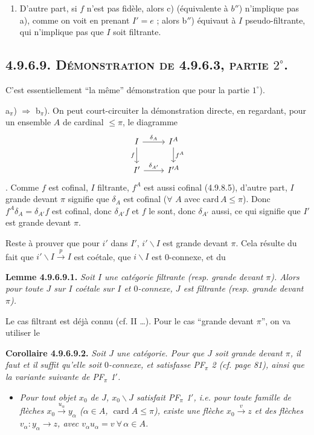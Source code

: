 \documentclass[11pt]{article}
\newcommand{\printedpage}[1]{\marginpar{\footnotesize p.~#1}}
\newcommand{\msp}[1]{\marginpar{\footnotesize [#1]}}
\newcommand{\card}{\operatorname{card}}
\newcommand{\bs}{\backslash}
\begin{document}
\begin{enumerate}[label=\arabic*$^\circ$)]
\item D'autre part, si $f$ n'est pas fidèle, alors c) (équivalente à $b''$) n'implique pas a), comme on voit en prenant $I' = e$ ; alors b$''$) équivaut à $I$ pseudo-filtrante, qui n'implique pas que $I$ soit filtrante.
\end{enumerate}

\subsection*{\msp{page 237}\textbf{4.9.6.9.} \textsc{Démonstration de 4.9.6.3, partie} $2^\circ$.}

C'est essentiellement “la même” démonstration que pour la partie $1^\circ$).

a$_\pi$) $\Longrightarrow$ b$_\pi$). On peut court-circuiter la démonstration directe, en regardant, pour un ensemble $A$ de cardinal $\leqslant \pi$, le diagramme
\[
\begin{tikzcd}
I \arrow[r, "\delta_A"] \arrow[d, "f"'] & I^A \arrow[d, "f^A"] \\
I' \arrow[r, "\delta_{A'}"] & I'^A
\end{tikzcd}
\]
. Comme $f$ est cofinal, $I$ filtrante, $f^A$ est aussi cofinal (4.9.8.5), d'autre part, $I$ grande devant $\pi$ signifie que $\delta_A$ est cofinal ($\forall$ $A$ avec $\mathrm{card}\, A \leqslant \pi$). Donc $f^A\delta_A = \delta_{A'}f$ est cofinal, donc $\delta_{A'}f$ et $f$ le sont, donc $\delta_{A'}$ aussi, ce qui signifie que $I'$ est grande devant $\pi$.

Reste à prouver que pour $i'$ dans $I'$, $i'\bs I$ est grande devant $\pi$. Cela résulte du fait que $i'\bs I \xrightarrow{p} I$ est coétale, que $i\bs I$ est 0-connexe, et du

\textbf{Lemme 4.9.6.9.1.} \textit{Soit $I$ une catégorie filtrante (resp. grande devant $\pi$). Alors pour toute $J$ sur $I$ coétale sur $I$ et $0$-connexe, $J$ est filtrante (resp. grande devant $\pi$).}

\printedpage{89}

Le cas filtrant est déjà connu (cf. II \dots). Pour le cas “grande devant $\pi$”, on va utiliser le

\textbf{Corollaire 4.9.6.9.2.} \textit{Soit $J$ une catégorie. Pour que $J$ soit grande devant $\pi$, il}
\msp{page 238}
\textit{faut et il suffit qu'elle soit $0$-connexe, et satisfasse PF$_\pi$ 2 (cf. page 81), ainsi que la variante suivante de PF$_\pi$ 1$'$.}
\begin{itemize}[leftmargin=4em]
\item[\textit{PF$_\pi$ 1)}] \textit{Pour tout objet $x_0$ de $J$, $x_0\backslash J$ satisfait PF$_\pi$ 1$'$, i.e. pour toute famille de flèches $x_0 \xrightarrow{u_\alpha} y_\alpha$ ($\alpha \in A$, $\card A \leqslant \pi$), existe une flèche $x_0 \xrightarrow{v} z$ et des flèches $v_\alpha : y_\alpha \longrightarrow z$, avec $v_\alpha u_\alpha = v \ \forall\, \alpha \in A$.}
\end{itemize}
\end{document}
